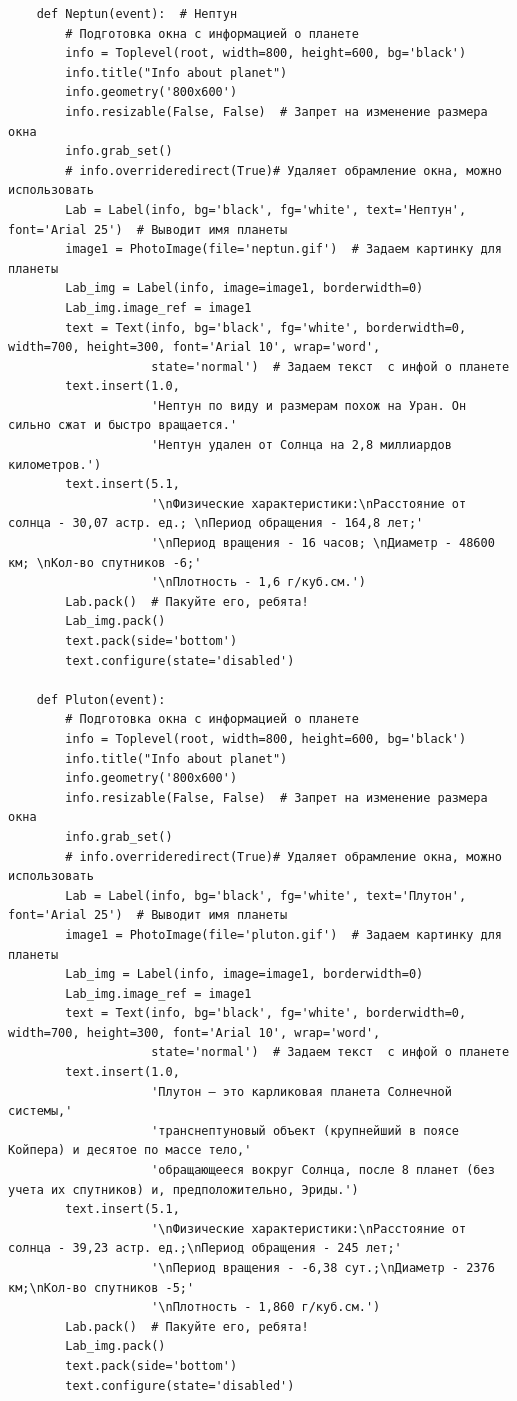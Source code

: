 \documentclass[11pt,a4paper]{report}
\begin{document}
\begin{verbatim}
    def Neptun(event):  # Нептун
        # Подготовка окна с информацией о планете
        info = Toplevel(root, width=800, height=600, bg='black')
        info.title("Info about planet")
        info.geometry('800x600')
        info.resizable(False, False)  # Запрет на изменение размера окна
        info.grab_set()
        # info.overrideredirect(True)# Удаляет обрамление окна, можно использовать
        Lab = Label(info, bg='black', fg='white', text='Нептун', font='Arial 25')  # Выводит имя планеты
        image1 = PhotoImage(file='neptun.gif')  # Задаем картинку для планеты
        Lab_img = Label(info, image=image1, borderwidth=0)
        Lab_img.image_ref = image1
        text = Text(info, bg='black', fg='white', borderwidth=0, width=700, height=300, font='Arial 10', wrap='word',
                    state='normal')  # Задаем текст  с инфой о планете
        text.insert(1.0,
                    'Нептун по виду и размерам похож на Уран. Он сильно сжат и быстро вращается.'
                    'Нептун удален от Солнца на 2,8 миллиардов километров.')
        text.insert(5.1,
                    '\nФизические характеристики:\nРасстояние от солнца - 30,07 астр. ед.; \nПериод обращения - 164,8 лет;'
                    '\nПериод вращения - 16 часов; \nДиаметр - 48600 км; \nКол-во спутников -6;'
                    '\nПлотность - 1,6 г/куб.см.')
        Lab.pack()  # Пакуйте его, ребята!
        Lab_img.pack()
        text.pack(side='bottom')
        text.configure(state='disabled')

    def Pluton(event):
        # Подготовка окна с информацией о планете
        info = Toplevel(root, width=800, height=600, bg='black')
        info.title("Info about planet")
        info.geometry('800x600')
        info.resizable(False, False)  # Запрет на изменение размера окна
        info.grab_set()
        # info.overrideredirect(True)# Удаляет обрамление окна, можно использовать
        Lab = Label(info, bg='black', fg='white', text='Плутон', font='Arial 25')  # Выводит имя планеты
        image1 = PhotoImage(file='pluton.gif')  # Задаем картинку для планеты
        Lab_img = Label(info, image=image1, borderwidth=0)
        Lab_img.image_ref = image1
        text = Text(info, bg='black', fg='white', borderwidth=0, width=700, height=300, font='Arial 10', wrap='word',
                    state='normal')  # Задаем текст  с инфой о планете
        text.insert(1.0,
                    'Плутон – это карликовая планета Солнечной системы,'
                    'транснептуновый объект (крупнейший в поясе Койпера) и десятое по массе тело,'
                    'обращающееся вокруг Солнца, после 8 планет (без учета их спутников) и, предположительно, Эриды.')
        text.insert(5.1,
                    '\nФизические характеристики:\nРасстояние от солнца - 39,23 астр. ед.;\nПериод обращения - 245 лет;'
                    '\nПериод вращения - -6,38 сут.;\nДиаметр - 2376 км;\nКол-во спутников -5;'
                    '\nПлотность - 1,860 г/куб.см.')
        Lab.pack()  # Пакуйте его, ребята!
        Lab_img.pack()
        text.pack(side='bottom')
        text.configure(state='disabled')


\end{verbatim}
\end{document}
